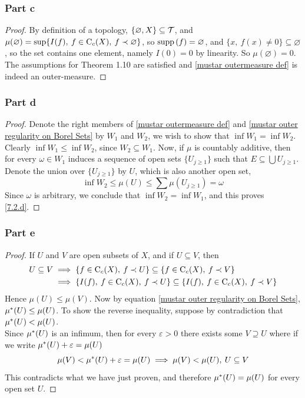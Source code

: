 \documentclass[../../main.tex]{subfiles}
\begin{document}
\subsubsection{Part c}
\begin{proof}
    By definition of a topology, $\{\varnothing, X\}\subseteq \mathcal{T}$, and $\mu(\varnothing) = \sup\{I(f),\: f\in\operatorname{C}_c({X}),\:f\prec \varnothing\}$, so $\operatorname{supp}{(f)}=\varnothing$, and $\{x,\:f(x)\neq 0\}\subseteq\varnothing$, so the set contains one element, namely $I(0)=0$ by linearity. So $\mu(\varnothing)=0$. The assumptions for Theorem 1.10 are satisfied and \eqref{mustar outermeasure def} is indeed an outer-measure.
\end{proof}

\subsubsection{Part d}
\begin{proof}
    Denote the right members of \eqref{mustar outermeasure def} and \eqref{mustar outer regularity on Borel Sets} by $W_1$ and $W_2$, we wish to show that $\inf{W_1} = \inf{W_2}$. Clearly $\inf{W_1}\leq \inf{W_2}$, since $W_2\subseteq W_1$. Now, if $\mu$ is countably additive, then for every $\omega\in W_1$ induces a sequence of open sets $\{U_{j\geq 1}\}$ such that $E\subseteq \bigcup U_{j\geq 1}$. Denote the union over $\{U_{j\geq 1}\}$ by $U$, which is also another open set, 
    \[
    \inf{W_2}\leq\mu(U)\leq \sum \mu(U_{j\geq 1})=\omega
    \]
    Since $\omega$ is arbitrary, we conclude that $\inf{W_2}=\inf{W_1}$, and this proves \ref{7.2.d}.
\end{proof}
\subsubsection{Part e}
\begin{proof}
    If $U$ and $V$ are open subsets of $X$, and if $U\subseteq V$, then
    \begin{align*}
        U\subseteq V &\implies\left\{f\in\operatorname{C}_c({X}),\:f\prec U\right\}\subseteq\left\{f\in\operatorname{C}_c({X}),\:f\prec V\right\} \\
        &\implies \left\{I(f),\:f\in\operatorname{C}_c({X}),\:f\prec U\right\}\subseteq\left\{I(f),\:f\in\operatorname{C}_c({X}),\:f\prec V\right\}
    \end{align*}
    Hence $\mu(U)\leq \mu(V)$. Now by equation \eqref{mustar outer regularity on Borel Sets}, $\mu^*(U)\leq \mu(U)$. To show the reverse inequality, suppose by contradiction that $\mu^*(U)<\mu(U)$.\\
    
    Since $\mu^*(U)$ is an infimum, then for every $\varepsilon>0$ there exists some $V\supseteq U$ where if we write $\mu^*(U)+\varepsilon=\mu(U)$
    \[
    \mu(V)<\mu^*(U)+\varepsilon=\mu(U)\implies \mu(V)<\mu(U),\:U\subseteq V
    \]
    This contradicts what we have just proven, and therefore $\mu^*(U)=\mu(U)$ for every open set $U$.
\end{proof}
\end{document}
